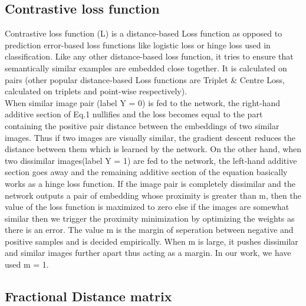 \documentclass[10pt,twocolumn,letterpaper]{article}
\begin{document}
\subsection{Contrastive loss function}
Contrastive loss function (L) \cite{c23} is a distance-based Loss function as opposed to prediction error-based loss functions like logistic loss or hinge loss used in classification. Like any other distance-based loss function, it tries to ensure that semantically similar examples are embedded close together. It is calculated on pairs (other popular distance-based Loss functions are Triplet \& Centre Loss, calculated on triplets and point-wise respectively).\\
When similar image pair (label Y = 0) is fed to the network, the right-hand additive section of Eq.1 nullifies and the loss becomes equal to the part containing the positive pair distance between the embeddings of two similar images. Thus if two images are visually similar, the gradient descent reduces the distance between them which is learned by the network. On the other hand, when two dissimilar images(label Y = 1) are fed to the network, the left-hand additive section goes away and the remaining additive section of the equation basically works as a hinge loss function. If the image pair is completely dissimilar and the network outputs a pair of embedding whose proximity is greater than m, then the value of the loss function is maximized to zero else if the images are somewhat similar then we trigger the proximity minimization by optimizing the weights as there is an error. The value m is the margin of seperation between negative and positive samples and is decided empirically. When m is large, it pushes dissimilar and similar images further apart thus acting as a margin. In our work, we have used m = 1.

\subsection{Fractional Distance matrix}
\end{document}
